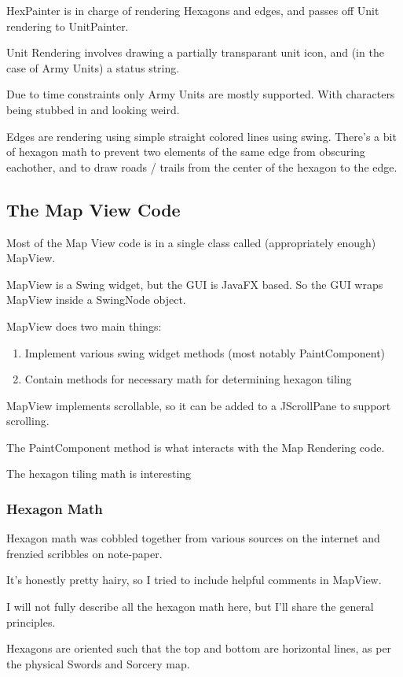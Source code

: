 \documentclass[12pt,a4paper]{article}
\begin{document}
HexPainter is in charge of rendering Hexagons and edges,
and passes off Unit rendering to UnitPainter.

Unit Rendering involves drawing a partially transparant unit icon,
and (in the case of Army Units) a status string.

Due to time constraints only Army Units are mostly supported. With characters
being stubbed in and looking weird.

Edges are rendering using simple straight colored lines using swing.
There's a bit of hexagon math to prevent two elements of the same edge
from obscuring eachother, and to draw roads / trails from the center of the
hexagon to the edge.


\subsection{The Map View Code}
Most of the Map View code is in a single class called (appropriately enough)
MapView.

MapView is a Swing widget, but the GUI is JavaFX based. So the GUI wraps
MapView inside a SwingNode object.

MapView does two main things:
\begin{enumerate}
\item{Implement various swing widget methods (most notably PaintComponent)}
\item{Contain methods for necessary math for determining hexagon tiling}
\end{enumerate}

MapView implements scrollable, so it can be added to a JScrollPane to support
scrolling.

The PaintComponent method is what interacts with the Map Rendering code.

The hexagon tiling math is interesting

\subsubsection{Hexagon Math}
Hexagon math was cobbled together from various sources on the internet and
frenzied scribbles on note-paper. 

It's honestly pretty hairy, so I tried to include helpful comments in
MapView.

I will not fully describe all the hexagon math here, but I'll share the general
principles.

Hexagons are oriented such that the top and bottom are horizontal lines,
as per the physical Swords and Sorcery map.
\end{document}
